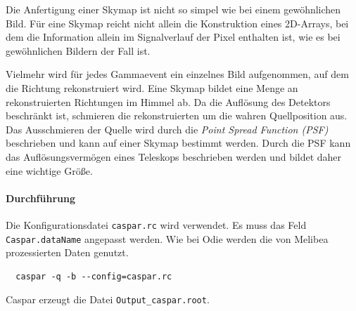 Die Anfertigung einer Skymap ist nicht so simpel wie bei einem gewöhnlichen
Bild.
Für eine Skymap reicht nicht allein die Konstruktion eines 2D-Arrays,
bei dem die Information allein im Signalverlauf der Pixel enthalten ist,
wie es bei gewöhnlichen Bildern der Fall ist.

Vielmehr wird für jedes Gammaevent ein einzelnes Bild aufgenommen,
auf dem die Richtung rekonstruiert wird.
Eine Skymap bildet eine Menge an rekonstruierten Richtungen im Himmel ab.
Da die Auflösung des Detektors beschränkt ist,
schmieren die rekonstruierten um die wahren Quellposition aus.
Das Ausschmieren der Quelle wird durch die \textit{Point Spread Function (PSF)}
beschrieben
und kann auf einer Skymap bestimmt werden.
Durch die PSF kann das Auflösungsvermögen eines Teleskops
beschrieben werden und bildet daher eine wichtige Größe.

\paragraph{Durchführung}%

Die Konfigurationsdatei \texttt{caspar.rc} wird verwendet.
Es muss das Feld \texttt{Caspar.dataName} angepasst werden.
Wie bei Odie werden die von Melibea prozessierten Daten genutzt.

\begin{lstlisting}
  caspar -q -b --config=caspar.rc
\end{lstlisting}

Caspar erzeugt die Datei \texttt{Output\_caspar.root}.
